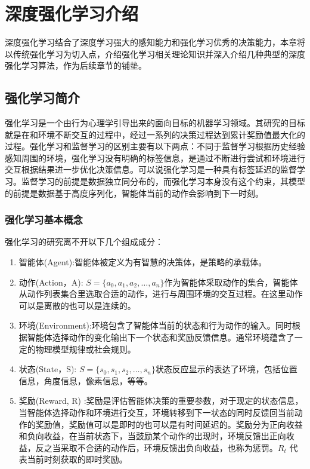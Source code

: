 \chapter{深度强化学习介绍}
深度强化学习结合了深度学习强大的感知能力和强化学习优秀的决策能力，本章将以传统强化学习为切入点，介绍强化学习相关理论知识并深入介绍几种典型的深度强化学习算法，作为后续章节的铺垫。

\section{强化学习简介}
强化学习是一个由行为心理学引导出来的面向目标的机器学习领域。其研究的目标就是在和环境不断交互的过程中，经过一系列的决策过程达到累计奖励值最大化的过程。强化学习和监督学习的区别主要有以下两点：不同于监督学习根据历史经验感知周围的环境，强化学习没有明确的标签信息，是通过不断进行尝试和环境进行交互根据结果进一步优化决策信息。可以说强化学习是一种具有标签延迟的监督学习。监督学习的前提是数据独立同分布的，而强化学习本身没有这个约束，其模型的前提是数据基于高度序列化，智能体当前的动作会影响到下一时刻。

\subsection{强化学习基本概念}

强化学习的研究离不开以下几个组成成分：

\begin{enumerate}
	\item 智能体(Agent):智能体被定义为有智慧的决策体，是策略的承载体。
	\item 动作(Action，A): $ S=\{a_{0},a_{1},a_{2},\dots,a_{n}\} $作为智能体采取动作的集合，智能体从动作列表集合里选取合适的动作，进行与周围环境的交互过程。在这里动作可以是离散的也可以是连续的。
	\item 环境(Environment):环境包含了智能体当前的状态和行为动作的输入。同时根据智能体选择动作的变化输出下一个状态和奖励反馈信息。通常环境蕴含了一定的物理模型规律或社会规则。
	\item 状态(State，S): $ S=\{s_{0},s_{1},s_{2},\dots,s_{n}\} $状态反应显示的表达了环境，包括位置信息，角度信息，像素信息，等等。
	\item 奖励(Reward, R) :奖励是评估智能体决策的重要参数，对于现定的状态信息，当智能体选择动作和环境进行交互，环境转移到下一状态的同时反馈回当前动作的奖励值，奖励值可以是即时的也可以是有时间延迟的。奖励分为正向收益和负向收益，在当前状态下，当鼓励某个动作的出现时，环境反馈出正向收益，反之当采取不合适的动作后，环境反馈出负向收益，也称为惩罚。${R_t}$ 代表当前时刻获取的即时奖励。
\end{enumerate}

